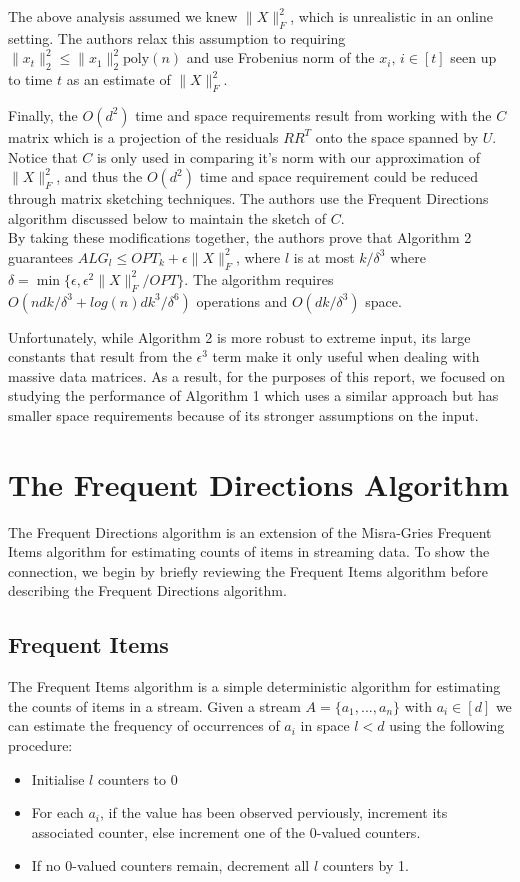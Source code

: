 \documentclass[11pt, oneside]{amsart}
\begin{document}
The above analysis assumed we knew $\|X\|_F^2$, which is unrealistic in an online setting. The authors relax this assumption to requiring $\|x_t\|_2^2 \leq \|x_1\|_2^2 \text{poly}(n)$ and use Frobenius norm of the $x_i, \, i\in[t]$ seen up to time $t$ as an estimate of $\|X\|_F^2$.

Finally, the ${O}(d^2)$ time and space requirements result from working with the $C$ matrix which is a projection of the residuals $RR^T$ onto the space spanned by $U$. Notice that $C$ is only used in comparing it's norm with our approximation of $\|X\|_F^2$, and thus the ${O}(d^2)$ time and space requirement could be reduced through matrix sketching techniques. The authors use the Frequent Directions algorithm discussed below to maintain the sketch of $C$.\\

By taking these modifications together, the authors prove that Algorithm 2 guarantees $ALG_l  \leq OPT_k + \epsilon \|X\|_F^2$, where $l$ is at most $k/\delta^3$ where $\delta = \min\{\epsilon, \epsilon^2 \|X\|^2_F/OPT\}$. The algorithm requires $O(ndk/\delta^3 + log(n)dk^3/\delta^6)$ operations and $O(dk/\delta^3)$ space.

Unfortunately, while Algorithm 2 is more robust to extreme input, its large constants that result from the $\epsilon^3$ term make it only useful when dealing with massive data matrices. As a result, for the purposes of this report, we focused on studying the performance of Algorithm 1 which uses a similar approach but has smaller space requirements because of its stronger assumptions on the input.

\section{The Frequent Directions Algorithm}
The Frequent Directions algorithm is an extension of the Misra-Gries Frequent Items algorithm for estimating counts of items in streaming data. To show the connection, we begin by briefly reviewing the Frequent Items algorithm before describing the Frequent Directions algorithm.

\subsection{Frequent Items}
The Frequent Items algorithm is a simple deterministic algorithm for estimating the counts of items in a stream. Given a stream $A = \{a_1, ... , a_n\}$ with $a_i \in [d]$ we can estimate the frequency of occurrences of $a_i$ in space $l < d$ using the following procedure:
\begin{itemize}
\item Initialise $l$ counters to 0
\item For each $a_i$, if the value has been observed perviously, increment its associated counter, else increment one of the 0-valued counters.
\item If no 0-valued counters remain, decrement all $l$ counters by 1.
\end{itemize}
\end{document}
